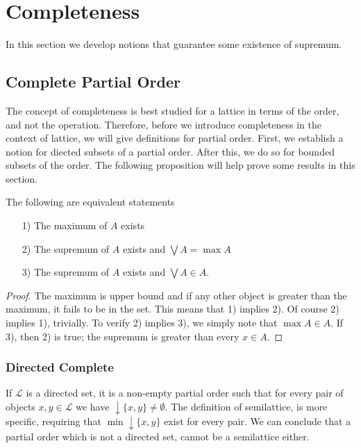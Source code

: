 \documentclass [12pt]{book}
\begin{document}
		\section{Completeness}

In this section we develop notions that guarantee some existence of supremum.

		\subsection{Complete Partial Order}

The concept of completeness is best studied for a lattice in terms of the order, and not the operation. Therefore, before we introduce completeness in the context of lattice, we will give definitions for partial order. First, we establish a notion for diected subsets of a partial order. After this, we do so for bounded subsets of the order. The following proposition will help prove some results in this section.

\begin{proposition}\label{sup max}The following are equivalent statements\begin{itemize}\item[1)]The maximum of $A$ exists\item[2)]The supremum of $A$ exists and $\bigvee A=\max A$\item[3)]The supremum of $A$ exists and $\bigvee A\in A$.\end{itemize}\end{proposition}

\begin{proof}The maximum is upper bound and if any other object is greater than the maximum, it fails to be in the set. This means that 1) implies 2). Of course 2) implies 1), trivially. To verify 2) implies 3), we simply note that $\max A\in A$. If 3), then 2) is true; the supremum is greater than every $x\in A$.\end{proof}

			\subsubsection{Directed Complete}

If $\mathcal L$ is a directed set, it is a non-empty partial order such that for every pair of objects $x,y\in\mathcal L$ we have $\downarrow\{x,y\}\neq\emptyset$. The definition of semilattice, is more specific, requiring that $\min\downarrow\{x,y\}$ exist for every pair. We can conclude that a partial order which is not a directed set, cannot be a semilattice either.
\end{document}
